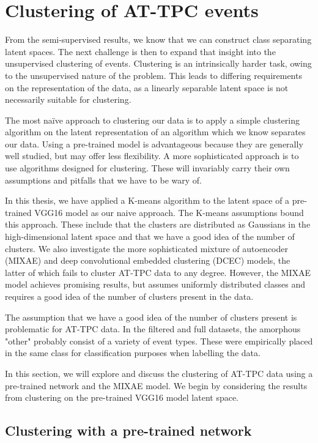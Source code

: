 \section{Clustering of AT-TPC events}

From the semi-supervised results, we know that we can construct class separating latent spaces. The next challenge is then to expand that insight into the unsupervised clustering of events. Clustering is an intrinsically harder task, owing to the unsupervised nature of the problem. This leads to differing requirements on the representation of the data, as a linearly separable latent space is not necessarily suitable for clustering. 

The most naïve approach to clustering our data is to apply a simple clustering algorithm on the latent representation of an algorithm which we know separates our data. Using a pre-trained model is advantageous because they are generally well studied, but may offer less flexibility.  A more sophisticated approach is to use algorithms designed for clustering. These will invariably carry their own assumptions and pitfalls that we have to be wary of. 

In this thesis, we have applied a K-means algorithm to the latent space of a pre-trained VGG16 model as our naive approach. The K-means assumptions bound this approach. These include that the clusters are distributed as Gaussians in the high-dimensional latent space and that we have a good idea of the number of clusters. We also investigate the more sophisticated mixture of autoencoder (MIXAE) and deep convolutional embedded clustering (DCEC) models, the latter of which fails to cluster AT-TPC data to any degree. However, the MIXAE model achieves promising results, but assumes uniformly distributed classes and requires a good idea of the number of clusters present in the data.

The assumption that we have a good idea of the number of clusters present is problematic for AT-TPC data. In the filtered and full datasets, the amorphous "other" probably consist of a variety of event types. These were empirically placed in the same class for classification purposes when labelling the data.

In this section, we will explore and discuss the clustering of AT-TPC data using a pre-trained network and the MIXAE model. We begin by considering the results from clustering on the pre-trained VGG16 model latent space. 

\subsection{Clustering with a pre-trained network}

